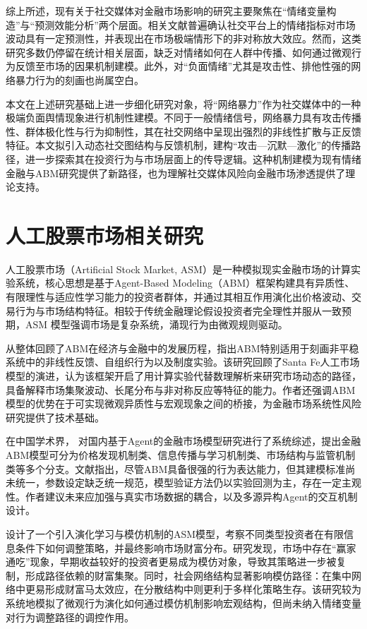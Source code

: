 综上所述，现有关于社交媒体对金融市场影响的研究主要聚焦在“情绪变量构造”与“预测效能分析”两个层面。相关文献普遍确认社交平台上的情绪指标对市场波动具有一定预测性，并表现出在市场极端情形下的非对称放大效应。然而，这类研究多数仍停留在统计相关层面，缺乏对情绪如何在人群中传播、如何通过微观行为反馈至市场的因果机制建模。此外，对“负面情绪”尤其是攻击性、排他性强的网络暴力行为的刻画也尚属空白。

本文在上述研究基础上进一步细化研究对象，将“网络暴力”作为社交媒体中的一种极端负面舆情现象进行机制性建模。不同于一般情绪信号，网络暴力具有攻击传播性、群体极化性与行为抑制性，其在社交网络中呈现出强烈的非线性扩散与正反馈特征。本文拟引入动态社交图结构与反馈机制，建构“攻击—沉默—激化”的传播路径，进一步探索其在投资行为与市场层面上的传导逻辑。这种机制建模为现有情绪金融与ABM研究提供了新路径，也为理解社交媒体风险向金融市场渗透提供了理论支持。


\section{人工股票市场相关研究}

人工股票市场（Artificial Stock Market, ASM）是一种模拟现实金融市场的计算实验系统，核心思想是基于Agent-Based Modeling（ABM）框架构建具有异质性、有限理性与适应性学习能力的投资者群体，并通过其相互作用演化出价格波动、交易行为与市场结构特征。相较于传统金融理论假设投资者完全理性并服从一致预期，ASM 模型强调市场是复杂系统，涌现行为由微观规则驱动。

\textcite{axtell2022agent} 从整体回顾了ABM在经济与金融中的发展历程，指出ABM特别适用于刻画非平稳系统中的非线性反馈、自组织行为以及制度实验。该研究回顾了Santa Fe人工市场模型的演进，认为该框架开启了用计算实验代替数理解析来研究市场动态的路径，具备解释市场集聚波动、长尾分布与非对称反应等特征的能力。作者还强调ABM模型的优势在于可实现微观异质性与宏观现象之间的桥接，为金融市场系统性风险研究提供了技术基础。

在中国学术界，\textcite{liu2020review} 对国内基于Agent的金融市场模型研究进行了系统综述，提出金融ABM模型可分为价格发现机制类、信息传播与学习机制类、市场结构与监管机制类等多个分支。文献指出，尽管ABM具备很强的行为表达能力，但其建模标准尚未统一，参数设定缺乏统一规范，模型验证方法仍以实验回测为主，存在一定主观性。作者建议未来应加强与真实市场数据的耦合，以及多源异构Agent的交互机制设计。

\textcite{gao2020wealth} 设计了一个引入演化学习与模仿机制的ASM模型，考察不同类型投资者在有限信息条件下如何调整策略，并最终影响市场财富分布。研究发现，市场中存在“赢家通吃”现象，早期收益较好的投资者更易成为模仿对象，导致其策略进一步被复制，形成路径依赖的财富集聚。同时，社会网络结构显著影响模仿路径：在集中网络中更易形成财富马太效应，在分散结构中则更利于多样化策略生存。该研究较为系统地模拟了微观行为演化如何通过模仿机制影响宏观结构，但尚未纳入情绪变量对行为调整路径的调控作用。

